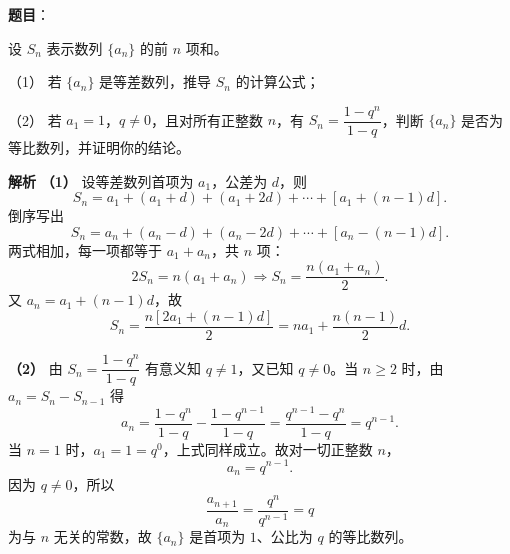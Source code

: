 \begin{answer}

\textbf{题目}：

设 $S_n$ 表示数列 $\{a_n\}$ 的前 $n$ 项和。

（1） 若 $\{a_n\}$ 是等差数列，推导 $S_n$ 的计算公式；

（2） 若 $a_1=1$，$q\ne0$，且对所有正整数 $n$，有 $S_n=\dfrac{1-q^n}{1-q}$，判断 $\{a_n\}$ 是否为等比数列，并证明你的结论。

\textbf{解析}
\textbf{（1）} 设等差数列首项为 $a_1$，公差为 $d$，则
\nopagebreak[4]
\[S_n=a_1+(a_1+d)+(a_1+2d)+\cdots+[a_1+(n-1)d].\]
倒序写出
\nopagebreak[4]
\[S_n=a_n+(a_n-d)+(a_n-2d)+\cdots+[a_n-(n-1)d].\]
两式相加，每一项都等于 $a_1+a_n$，共 $n$ 项：
\nopagebreak[4]
\[2S_n=n(a_1+a_n)\Longrightarrow S_n=\frac{n(a_1+a_n)}2.\]
又 $a_n=a_1+(n-1)d$，故
\nopagebreak[4]
\[S_n=\frac{n[2a_1+(n-1)d]}2=na_1+\frac{n(n-1)}2d.\]

\textbf{（2）} 由 $S_n=\dfrac{1-q^n}{1-q}$ 有意义知 $q\neq1$，又已知 $q\neq0$。当 $n\geqslant2$ 时，由 $a_n=S_n-S_{n-1}$ 得
\nopagebreak[4]
\[a_n=\frac{1-q^n}{1-q}-\frac{1-q^{n-1}}{1-q}
=\frac{q^{n-1}-q^n}{1-q}=q^{n-1}.\]
当 $n=1$ 时，$a_1=1=q^0$，上式同样成立。故对一切正整数 $n$，
\nopagebreak[4]
\[a_n=q^{n-1}.\]
因为 $q\neq0$，所以
\nopagebreak[4]
\[\frac{a_{n+1}}{a_n}=\frac{q^n}{q^{n-1}}=q\]
为与 $n$ 无关的常数，故 $\{a_n\}$ 是首项为 $1$、公比为 $q$ 的等比数列。



\end{answer}
